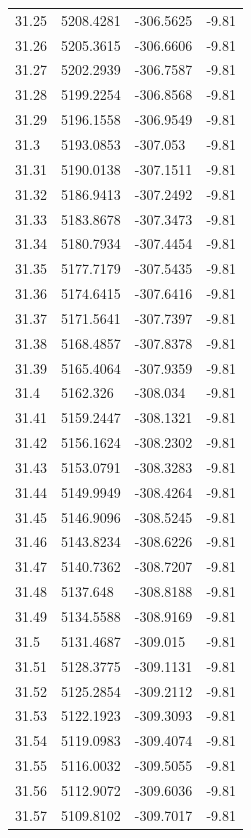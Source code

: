 \begin{table}[H]
\begin{tabular}{llll}
31.25 & 5208.4281 & -306.5625 & -9.81 \\
31.26 & 5205.3615 & -306.6606 & -9.81 \\
31.27 & 5202.2939 & -306.7587 & -9.81 \\
31.28 & 5199.2254 & -306.8568 & -9.81 \\
31.29 & 5196.1558 & -306.9549 & -9.81 \\
31.3 & 5193.0853 & -307.053 & -9.81 \\
31.31 & 5190.0138 & -307.1511 & -9.81 \\
31.32 & 5186.9413 & -307.2492 & -9.81 \\
31.33 & 5183.8678 & -307.3473 & -9.81 \\
31.34 & 5180.7934 & -307.4454 & -9.81 \\
31.35 & 5177.7179 & -307.5435 & -9.81 \\
31.36 & 5174.6415 & -307.6416 & -9.81 \\
31.37 & 5171.5641 & -307.7397 & -9.81 \\
31.38 & 5168.4857 & -307.8378 & -9.81 \\
31.39 & 5165.4064 & -307.9359 & -9.81 \\
31.4 & 5162.326 & -308.034 & -9.81 \\
31.41 & 5159.2447 & -308.1321 & -9.81 \\
31.42 & 5156.1624 & -308.2302 & -9.81 \\
31.43 & 5153.0791 & -308.3283 & -9.81 \\
31.44 & 5149.9949 & -308.4264 & -9.81 \\
31.45 & 5146.9096 & -308.5245 & -9.81 \\
31.46 & 5143.8234 & -308.6226 & -9.81 \\
31.47 & 5140.7362 & -308.7207 & -9.81 \\
31.48 & 5137.648 & -308.8188 & -9.81 \\
31.49 & 5134.5588 & -308.9169 & -9.81 \\
31.5 & 5131.4687 & -309.015 & -9.81 \\
31.51 & 5128.3775 & -309.1131 & -9.81 \\
31.52 & 5125.2854 & -309.2112 & -9.81 \\
31.53 & 5122.1923 & -309.3093 & -9.81 \\
31.54 & 5119.0983 & -309.4074 & -9.81 \\
31.55 & 5116.0032 & -309.5055 & -9.81 \\
31.56 & 5112.9072 & -309.6036 & -9.81 \\
31.57 & 5109.8102 & -309.7017 & -9.81 \\

\end{tabular}
\end{table}
